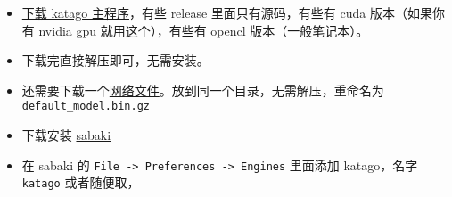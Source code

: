 
\begin{issues}
\issueDraft
\end{issues}

\begin{itemize}
\item \href{https://github.com/lightvector/KataGo/releases}{下载 katago 主程序}，有些 release 里面只有源码，有些有 cuda 版本（如果你有 nvidia gpu 就用这个），有些有 opencl 版本（一般笔记本）。
\item 下载完直接解压即可，无需安装。
\item 还需要下载一个\href{https://katagotraining.org/networks/}{网络文件}。放到同一个目录，无需解压，重命名为 \verb|default_model.bin.gz|
\item 下载安装 \href{https://sabaki.yichuanshen.de/}{sabaki}
\item 在 sabaki 的 \verb|File -> Preferences -> Engines| 里面添加 katago，名字 \verb|katago| 或者随便取， 
\end{itemize}

